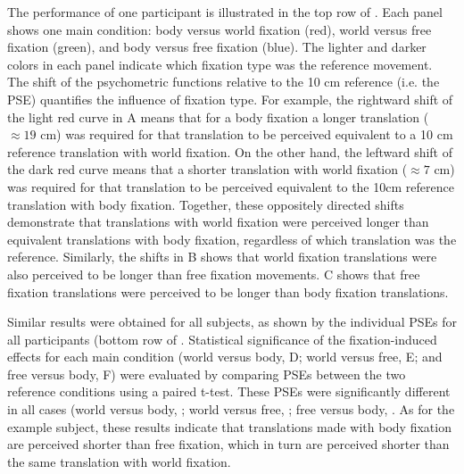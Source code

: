 The performance of one participant is illustrated in the top row of . Each panel shows one main condition: body versus world fixation (red), world versus free fixation (green), and body versus free fixation (blue). The lighter and darker colors in each panel indicate which fixation type was the reference movement. The shift of the psychometric functions relative to the 10 \si{\centi\metre} reference (i.e. the PSE) quantifies the influence of fixation type. For example, the rightward shift of the light red curve in A means that for a body fixation a longer translation ($\approx 19$ \si{\centi\metre}) was required for that translation to be perceived equivalent to a 10 \si{\centi\metre} reference translation with world fixation. On the other hand, the leftward shift of the dark red curve means that a shorter translation with world fixation ($\approx 7$ \si{\centi\metre}) was required for that translation to be perceived equivalent to the 10cm reference translation with body fixation. Together, these oppositely directed shifts demonstrate that translations with world fixation were perceived longer than equivalent translations with body fixation, regardless of which translation was the reference. Similarly, the shifts in B shows that world fixation translations were also perceived to be longer than free fixation movements. C shows that free fixation translations were perceived to be longer than body fixation translations.

Similar results were obtained for all subjects, as shown by the individual PSEs for all participants (bottom row of . Statistical significance of the fixation-induced effects for each main condition (world versus body, D; world versus free, E; and free versus body, F) were evaluated by comparing PSEs between the two reference conditions using a paired t-test. These PSEs were significantly different in all cases (world versus body, ; world versus free, ; free versus body, . As for the example subject, these results indicate that translations made with body fixation are perceived shorter than free fixation, which in turn are perceived shorter than the same translation with world fixation.

